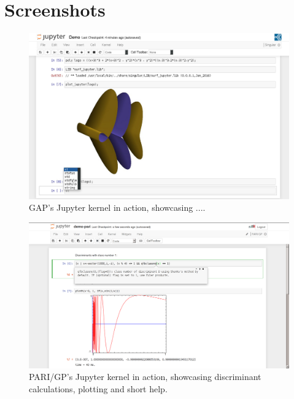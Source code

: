 \documentclass{deliverablereport}
\author{Nicolas M. Thiéry}
\begin{document}
\maketitle
\githubissuedescription
\tableofcontents
\clearpage
\section{Screenshots}
\begin{figure}[h]
  \includegraphics[height=.4\textheight]{singular.png}
  \caption{GAP's Jupyter kernel in action, showcasing ....}
\end{figure}
\begin{figure}[h]
  \includegraphics[height=.4\textheight]{pari.png}
  \caption{PARI/GP's Jupyter kernel in action, showcasing
    discriminant calculations, plotting and short help.}
\end{figure}
\end{document}
